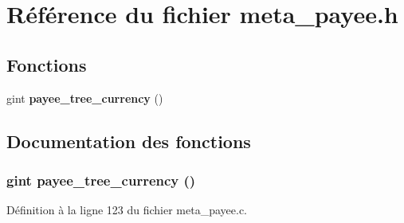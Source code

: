 \section{Référence du fichier meta\_\-payee.h}
\label{meta__payee_8h}
\subsection*{Fonctions}
\begin{DoxyCompactItemize}
\item 
gint {\bf payee\_\-tree\_\-currency} ()
\end{DoxyCompactItemize}


\subsection{Documentation des fonctions}
\subsubsection[{payee\_\-tree\_\-currency}]{\setlength{\rightskip}{0pt plus 5cm}gint payee\_\-tree\_\-currency ()}\label{meta__payee_8h_a13137d55a50bdd16328232e84af26b44}


Définition à la ligne 123 du fichier meta\_\-payee.c.

